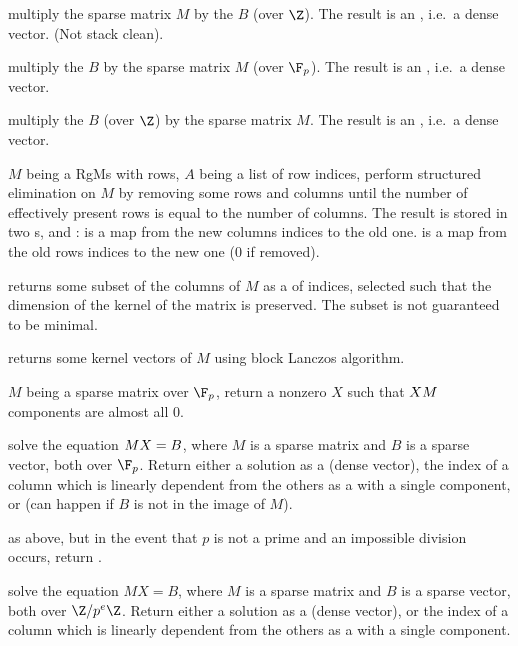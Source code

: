  multiply the sparse matrix $M$
by the  $B$ (over $\Z$). The result is an , i.e.~a
dense vector. (Not stack clean).

 multiply the  $B$
by the sparse matrix $M$ (over $\F_p$). The result is an , i.e.~a
dense vector.

 multiply the   $B$ (over
$\Z$) by the sparse matrix $M$. The result is an , i.e.~a
dense vector.

$M$ being a RgMs with  rows, $A$ being a list of row indices,
perform structured elimination on $M$ by removing some rows and columns until
the number of effectively present rows is equal to the number of columns.
The result is stored in two s,  and :
 is a map from the new columns indices to the old one.
 is a map from the old rows indices to the new one ($0$ if removed).

 returns some subset of the columns
of $M$ as a  of indices, selected such that the dimension of the
kernel of the matrix is preserved. The subset is not guaranteed to be minimal.

 returns some kernel vectors of $M$
using block Lanczos algorithm.

$M$ being a sparse matrix over $\F_p$, return a nonzero  $X$ such
that $X\*M$ components are almost all $0$.

solve the equation $M\*X = B$, where $M$ is a sparse matrix and $B$ is a sparse
vector, both over $\F_p$. Return either a solution as a  (dense
vector), the index of a column which is linearly dependent from the
others as a  with a single component, or 
(can happen if $B$ is not in the image of $M$).

as above, but in the event that $p$ is not a prime and an impossible division
occurs, return .

solve the equation $MX = B$, where $M$ is a sparse matrix and $B$ is a sparse
vector, both over $\Z/p^e\Z$. Return either a solution as a  (dense
vector), or the index of a column which is linearly dependent from the
others as a  with a single component.

